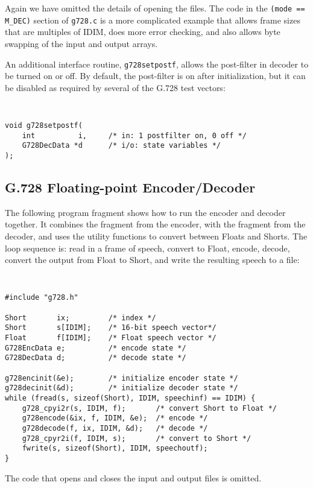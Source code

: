 Again we have omitted the details of opening the files.
The code in the {\tt (mode == M\_DEC)} section of {\tt g728.c} is a more
complicated example that allows frame sizes that are multiples of IDIM,
does more error checking, and also allows byte swapping of the input
and output arrays.

An additional interface routine, {\tt g728setpostf}, allows the
post-filter in decoder to be turned on or off. By default, the
post-filter is on after initialization, but it can be disabled as
required by several of the G.728 test vectors:

{\tt\small
\begin{verbatim}
void g728setpostf(
    int          i,     /* in: 1 postfilter on, 0 off */
    G728DecData *d      /* i/o: state variables */
);
\end{verbatim}
}

\subsection {G.728 Floating-point Encoder/Decoder}

The following program fragment shows how to run the encoder and
decoder together. It combines the fragment from the encoder, with the fragment
from the decoder, and uses the utility functions to convert between
Floats and Shorts. The loop sequence is: read in a frame of speech, convert
to Float, encode, decode, convert the output from Float to Short, and write
the resulting speech to a file:

{\tt\small
\begin{verbatim}
#include "g728.h"

Short       ix;         /* index */
Short       s[IDIM];    /* 16-bit speech vector*/
Float       f[IDIM];    /* Float speech vector */
G728EncData e;          /* encode state */
G728DecData d;          /* decode state */

g728encinit(&e);        /* initialize encoder state */
g728decinit(&d);        /* initialize decoder state */
while (fread(s, sizeof(Short), IDIM, speechinf) == IDIM) {
    g728_cpyi2r(s, IDIM, f);       /* convert Short to Float */
    g728encode(&ix, f, IDIM, &e);  /* encode */
    g728decode(f, ix, IDIM, &d);   /* decode */
    g728_cpyr2i(f, IDIM, s);       /* convert to Short */
    fwrite(s, sizeof(Short), IDIM, speechoutf);
}
\end{verbatim}
}

The code that opens and closes the input and output files is omitted.

